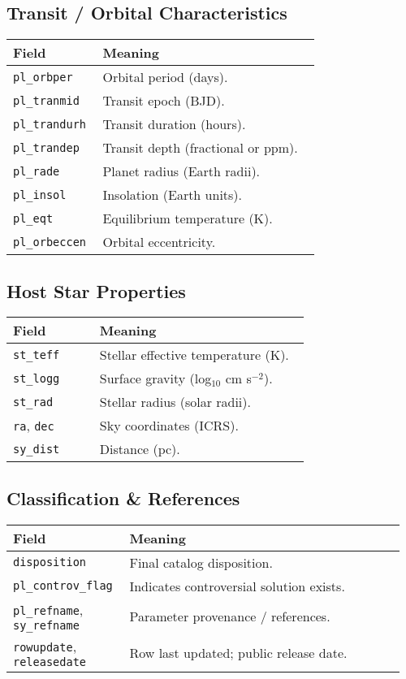 \documentclass{article}
\begin{document}
\subsection*{Transit / Orbital Characteristics}
\begin{tabular}{@{}p{0.28\linewidth} p{0.68\linewidth}@{}}
\toprule
\textbf{Field} & \textbf{Meaning} \\ \midrule
\texttt{pl\_orbper} & Orbital period (days). \\
\texttt{pl\_tranmid} & Transit epoch (BJD). \\
\texttt{pl\_trandurh} & Transit duration (hours). \\
\texttt{pl\_trandep} & Transit depth (fractional or ppm). \\
\texttt{pl\_rade} & Planet radius (Earth radii). \\
\texttt{pl\_insol} & Insolation (Earth units). \\
\texttt{pl\_eqt} & Equilibrium temperature (K). \\
\texttt{pl\_orbeccen} & Orbital eccentricity. \\
\bottomrule
\end{tabular}

\subsection*{Host Star Properties}
\begin{tabular}{@{}p{0.28\linewidth} p{0.68\linewidth}@{}}
\toprule
\textbf{Field} & \textbf{Meaning} \\ \midrule
\texttt{st\_teff} & Stellar effective temperature (K). \\
\texttt{st\_logg} & Surface gravity (log$_{10}$ cm s$^{-2}$). \\
\texttt{st\_rad} & Stellar radius (solar radii). \\
\texttt{ra}, \texttt{dec} & Sky coordinates (ICRS). \\
\texttt{sy\_dist} & Distance (pc). \\
\bottomrule
\end{tabular}

\subsection*{Classification \& References}
\begin{tabular}{@{}p{0.28\linewidth} p{0.68\linewidth}@{}}
\toprule
\textbf{Field} & \textbf{Meaning} \\ \midrule
\texttt{disposition} & Final catalog disposition. \\
\texttt{pl\_controv\_flag} & Indicates controversial solution exists. \\
\texttt{pl\_refname}, \texttt{sy\_refname} & Parameter provenance / references. \\
\texttt{rowupdate}, \texttt{releasedate} & Row last updated; public release date. \\
\bottomrule
\end{tabular}
\end{document}
